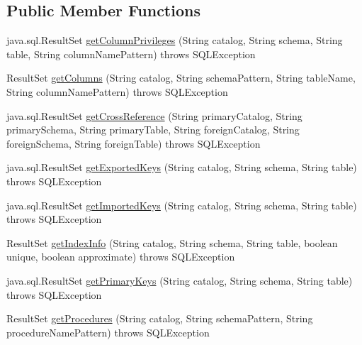 \subsection*{Public Member Functions}
\begin{DoxyCompactItemize}
\item 
java.\+sql.\+Result\+Set \mbox{\hyperlink{classcom_1_1mysql_1_1jdbc_1_1_database_meta_data_using_info_schema_a21958250d37526385b0bfc7e0699c6bf}{get\+Column\+Privileges}} (String catalog, String schema, String table, String column\+Name\+Pattern)  throws S\+Q\+L\+Exception 
\item 
Result\+Set \mbox{\hyperlink{classcom_1_1mysql_1_1jdbc_1_1_database_meta_data_using_info_schema_a32e04e3285884390a2cfd25bfb1fc544}{get\+Columns}} (String catalog, String schema\+Pattern, String table\+Name, String column\+Name\+Pattern)  throws S\+Q\+L\+Exception 
\item 
java.\+sql.\+Result\+Set \mbox{\hyperlink{classcom_1_1mysql_1_1jdbc_1_1_database_meta_data_using_info_schema_a720ac1db468802b830153fb7300155d8}{get\+Cross\+Reference}} (String primary\+Catalog, String primary\+Schema, String primary\+Table, String foreign\+Catalog, String foreign\+Schema, String foreign\+Table)  throws S\+Q\+L\+Exception 
\item 
java.\+sql.\+Result\+Set \mbox{\hyperlink{classcom_1_1mysql_1_1jdbc_1_1_database_meta_data_using_info_schema_a5340c760bf25beeec6aff524824dbda8}{get\+Exported\+Keys}} (String catalog, String schema, String table)  throws S\+Q\+L\+Exception 
\item 
java.\+sql.\+Result\+Set \mbox{\hyperlink{classcom_1_1mysql_1_1jdbc_1_1_database_meta_data_using_info_schema_a53a952ae6bd3ef46f348c882a06358db}{get\+Imported\+Keys}} (String catalog, String schema, String table)  throws S\+Q\+L\+Exception 
\item 
Result\+Set \mbox{\hyperlink{classcom_1_1mysql_1_1jdbc_1_1_database_meta_data_using_info_schema_a0bb4ecdb1ce309f41ee03ffe637f3a98}{get\+Index\+Info}} (String catalog, String schema, String table, boolean unique, boolean approximate)  throws S\+Q\+L\+Exception 
\item 
java.\+sql.\+Result\+Set \mbox{\hyperlink{classcom_1_1mysql_1_1jdbc_1_1_database_meta_data_using_info_schema_a65812af65021eed61d345630af494ca3}{get\+Primary\+Keys}} (String catalog, String schema, String table)  throws S\+Q\+L\+Exception 
\item 
Result\+Set \mbox{\hyperlink{classcom_1_1mysql_1_1jdbc_1_1_database_meta_data_using_info_schema_a1f2fd58fdf545dc23641793c4035f91d}{get\+Procedures}} (String catalog, String schema\+Pattern, String procedure\+Name\+Pattern)  throws S\+Q\+L\+Exception 

\end{DoxyCompactItemize}
